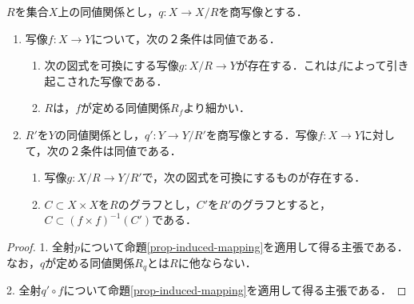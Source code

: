 \documentclass[uplatex,dvipdfmx]{jsreport}
\begin{document}
\begin{corollary}[商集合の普遍性]
    $R$を集合$X$上の同値関係とし，$q:X\to X/R$を商写像とする．
    \begin{enumerate}
        \item 写像$f:X\to Y$について，次の２条件は同値である．
        \begin{enumerate}[(1)]
            \item 次の図式を可換にする写像$g:X/R\to Y$が存在する．これは$f$によって引き起こされた写像である．\begin{center}\end{center}
            \item $R$は，$f$が定める同値関係$R_f$より細かい．
        \end{enumerate}
        \item $R'$を$Y$の同値関係とし，$q':Y\to Y/R'$を商写像とする．写像$f:X\to Y$に対して，次の２条件は同値である．
        \begin{enumerate}[(1)]
            \item 写像$g:X/R\to Y/R'$で，次の図式を可換にするものが存在する．
            \begin{center}\end{center}
            \item $C\subset X\times X$を$R$のグラフとし，$C'$を$R'$のグラフとすると，$C\subset (f\times f)^{-1}(C')$である．
        \end{enumerate}
    \end{enumerate}
\end{corollary}
\begin{proof}
    1. 全射$p$について命題\ref{prop-induced-mapping}を適用して得る主張である．なお，$q$が定める同値関係$R_q$とは$R$に他ならない．
    
    2. 全射$q'\circ f$について命題\ref{prop-induced-mapping}を適用して得る主張である．
\end{proof}
\end{document}
